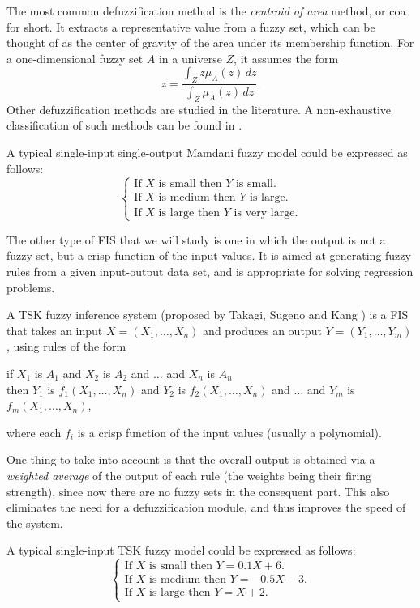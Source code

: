 The most common defuzzification method is the \textit{centroid of area} method, or \acrshort{coa} for short. It extracts a representative value from a fuzzy set, which can be thought of as the center of gravity of the area under its membership function. For a one-dimensional fuzzy set $A$ in a universe $Z$, it assumes the form
\[
z = \frac{\int_Z z\mu_A(z)\, dz}{\int_Z \mu_A(z)\, dz}.
\]
Other defuzzification methods are studied in the literature. A non-exhaustive classification of such methods can be found in \cite{leekwijck1999defuzzification}.

\begin{example}
  A typical single-input single-output Mamdani fuzzy model could be expressed as follows:
  \[
  \left\{ \begin{array}{l}
	\text{If $X$ is small then $Y$ is small}.\\
  \text{If $X$ is medium then $Y$ is large}.\\
	\text{If $X$ is large then $Y$ is very large}.
\end{array}\right.
\]
\end{example}

The other type of FIS that we will study is one in which the output is not a fuzzy set, but a crisp function of the input values. It is aimed at generating fuzzy rules from a given input-output data set, and is appropriate for solving regression problems.

\begin{definition} A TSK fuzzy inference system (proposed by Takagi, Sugeno and Kang \cite{takagi1985identification, sugeno1988structure}) is a FIS that takes an input $X=(X_1,\dots,X_n)$ and produces an output $Y = (Y_1, \dots, Y_m)$, using rules of the form
\begin{center}
  if $X_1$ is $A_1$ and $X_2$ is $A_2$ and $\dots$ and $X_n$ is $A_n$\\
  then $Y_1$ is $f_1(X_1, \dots, X_n)$ and $Y_2$ is $f_2(X_1, \dots, X_n)$ and $\dots$ and $Y_m$ is $f_m(X_1, \dots, X_n)$,
\end{center}
where each $f_i$ is a crisp function of the input values (usually a polynomial).
\end{definition}

One thing to take into account is that the overall output is obtained via a \textit{weighted average} of the output of each rule (the weights being their firing strength), since now there are no fuzzy sets in the consequent part. This also eliminates the need for a defuzzification module, and thus improves the speed of the system.

\begin{example}
  A typical single-input TSK fuzzy model could be expressed as follows:
  \[
  \left\{ \begin{array}{l}
	\text{If $X$ is small then $Y=0.1X + 6$}.\\
  \text{If $X$ is medium then $Y=-0.5X -3$}.\\
	\text{If $X$ is large then $Y=X+2$}.
\end{array}\right.
\]
\end{example}
